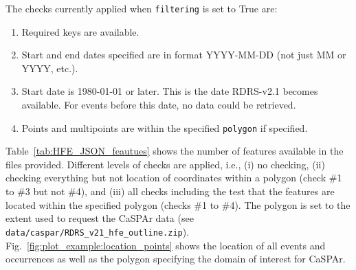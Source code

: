 \documentclass[10pt,a4paper,titlepage,parskip]{scrartcl}
\begin{document}
The checks currently applied when \texttt{filtering} is set to True are:
\begin{enumerate}[Check \#1.] 
	\item Required keys are available.
	\item Start and end dates specified are in format YYYY-MM-DD (not just MM or YYYY, etc.).
	\item Start date is 1980-01-01 or later. This is the date RDRS-v2.1 becomes available. For events before this date, no data could be retrieved.
	\item Points and multipoints are within the specified \texttt{polygon} if specified.
\end{enumerate}

Table~\ref{tab:HFE_JSON_feautues} shows the number of features available in the files provided. Different levels of checks are applied, i.e., (i) no checking, (ii) checking everything but not location of coordinates within a polygon (check \#1 to \#3 but not \#4), and (iii) all checks including the test that the features are located within the specified polygon (checks \#1 to \#4). The polygon is set to the extent used to request the CaSPAr data (see \texttt{data/caspar/RDRS\_v21\_hfe\_outline.zip}). Fig.~\ref{fig:plot_example:location_points} shows the location of all events and occurrences as well as the polygon specifying the domain of interest for CaSPAr.
\end{document}
